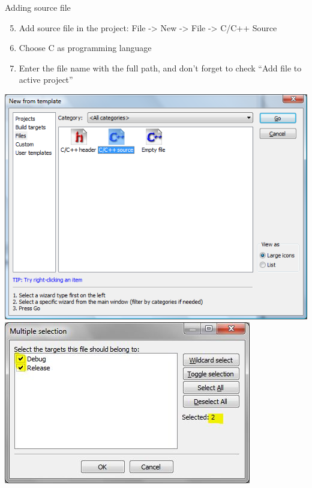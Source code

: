 \begin{frame}{Adding source file}
\begin{enumerate}
\setcounter{enumi}{4}
  \item Add source file in the project:
  File -> New -> File -> C/C++ Source
  \item Choose C as programming language 
  \item Enter the file name with the full path, and don't forget to check ``Add
  file to active project''
\end{enumerate}
\begin{center}
\includegraphics[scale=0.25]{images/cb_source}
\includegraphics[scale=0.4]{images/cb_include}
\end{center}
\end{frame}

